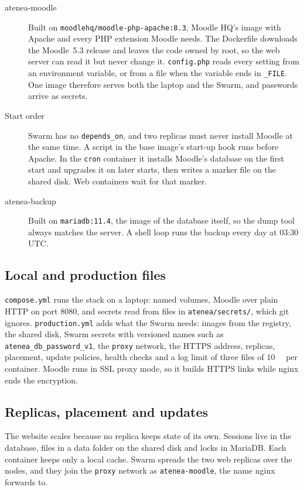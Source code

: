 \begin{description}
  \item[atenea-moodle] Built on \texttt{moodlehq/moodle-php-apache:8.3},
    Moodle HQ's image with Apache and every PHP extension Moodle needs.
    The Dockerfile downloads the Moodle~5.3 release and leaves the code
    owned by root, so the web server can read it but never change it.
    \texttt{config.php} reads every setting from an environment variable,
    or from a file when the variable ends in \texttt{\_FILE}. One image
    therefore serves both the laptop and the Swarm, and passwords arrive
    as secrets.
  \item[Start order] Swarm has no \texttt{depends\_on}, and two replicas
    must never install Moodle at the same time. A script in the base
    image's start-up hook runs before Apache. In the \texttt{cron}
    container it installs Moodle's database on the first start and
    upgrades it on later starts, then writes a marker file on the shared
    disk. Web containers wait for that marker.
  \item[atenea-backup] Built on \texttt{mariadb:11.4}, the image of the
    database itself, so the dump tool always matches the server. A shell
    loop runs the backup every day at 03:30 UTC.
\end{description}

\subsection{Local and production files}

\texttt{compose.yml} runs the stack on a laptop: named volumes, Moodle
over plain HTTP on port 8080, and secrets read from files in
\texttt{atenea/secrets/}, which git ignores. \texttt{production.yml} adds
what the Swarm needs: images from the registry, the shared disk, Swarm
secrets with versioned names such as \texttt{atenea\_db\_password\_v1},
the \texttt{proxy} network, the HTTPS address, replicas, placement,
update policies, health checks and a log limit of three files of
\qty{10}{\mega\byte} per container. Moodle runs in SSL proxy mode, so it
builds HTTPS links while nginx ends the encryption.

\subsection{Replicas, placement and updates}

The website scales because no replica keeps state of its own. Sessions
live in the database, files in a data folder on the shared disk and
locks in MariaDB. Each container keeps only a local cache. Swarm spreads
the two web replicas over the nodes, and they join the \texttt{proxy}
network as \texttt{atenea-moodle}, the name nginx forwards to.

